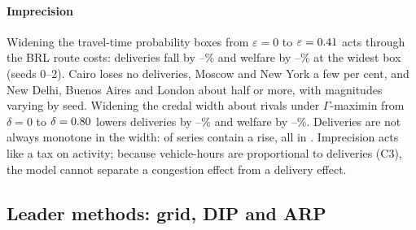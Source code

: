 \documentclass[preprint,11pt]{elsarticle}
\theoremstyle{definition}
\theoremstyle{remark}
\begin{document}
\paragraph{Imprecision} Widening the travel-time probability boxes from $\varepsilon=0$ to $\varepsilon=0.41$ acts through the BRL route costs: deliveries fall by \EfourPbDelMin--\EfourPbDelMax\% and welfare by \EfourPbWMin--\EfourPbWMax\% at the widest box (seeds 0--2). Cairo loses no deliveries, Moscow and New York a few per cent, and New Delhi, Buenos Aires and London about half or more, with magnitudes varying by seed. Widening the credal width about rivals under $\Gamma$-maximin from $\delta=0$ to $\delta=0.80$ lowers deliveries by \EfourGaDelMin--\EfourGaDelMax\% and welfare by \EfourGaWMin--\EfourGaWMax\%. Deliveries are not always monotone in the width: \EfourNonMonoN{} of \EfourSeries{} series contain a rise, all in \EfourNonMonoCities. Imprecision acts like a tax on activity; because vehicle-hours are proportional to deliveries (C3), the model cannot separate a congestion effect from a delivery effect.

\subsection{Leader methods: grid, DIP and ARP}\label{sec:res-leader}
\end{document}

